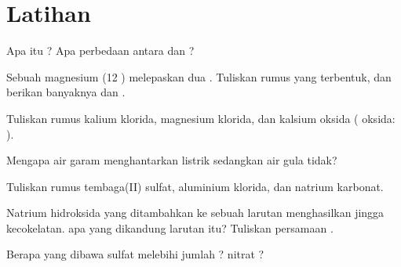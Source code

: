 \section{Latihan}

\begin{exercise}[$\star$]\label{exo:g9:ions:1}
Apa itu ? Apa perbedaan antara  dan ?
\end{exercise}

\begin{exercise}[$\star$]\label{exo:g9:ions:2}
Sebuah  magnesium (12 ) melepaskan dua . Tuliskan
rumus  yang terbentuk, dan berikan banyaknya  dan .
\end{exercise}

\begin{exercise}[$\star$]\label{exo:g9:ions:3}
Tuliskan rumus kalium klorida, magnesium klorida, dan kalsium oksida
( oksida: ).
\end{exercise}

\begin{exercise}[$\star$]\label{exo:g9:ions:4}
Mengapa air garam menghantarkan listrik sedangkan air gula tidak?
\end{exercise}

\begin{exercise}[$\star\star$]\label{exo:g9:ions:5}
Tuliskan rumus tembaga(II) sulfat, aluminium klorida, dan natrium
karbonat.
\end{exercise}

\begin{exercise}[$\star\star$]\label{exo:g9:ions:6}
Natrium hidroksida yang ditambahkan ke sebuah larutan menghasilkan
 jingga kecokelatan.  apa yang dikandung larutan itu? Tuliskan
persamaan .
\end{exercise}

\begin{exercise}[$\star\star$]\label{exo:g9:ions:7}
Berapa  yang dibawa  sulfat  melebihi jumlah
?  nitrat ?
\end{exercise}

